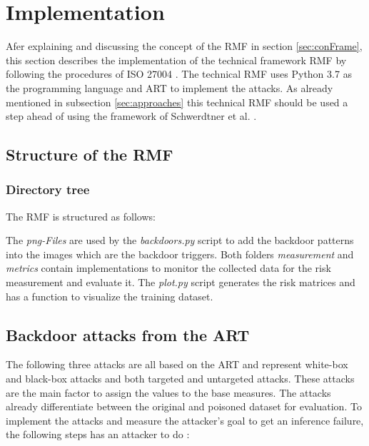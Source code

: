 \section{Implementation}
\label{sec:implementation}

Afer explaining and discussing the concept of the RMF in section \ref{sec:conFrame}, this section describes the implementation of the technical framework RMF by following the procedures of ISO 27004 \cite{ISO_27004_2009}. The technical RMF uses Python 3.7 \cite{10.5555/1593511} as the programming language and ART to implement the attacks. As already mentioned in subsection \ref{sec:approaches} this technical RMF should be used a step ahead of using the framework of Schwerdtner et al. \cite{DBLP:journals/corr/abs-2011-04328}.

\subsection{Structure of the RMF}

\subsubsection*{Directory tree}

The RMF is structured as follows: \\


\hfill \break \noindent The \textit{png-Files} are used by the \textit{backdoors.py} script to add the backdoor patterns into the images which are the backdoor triggers. Both folders \textit{measurement} and \textit{metrics} contain implementations to monitor the collected data for the risk measurement and evaluate it. The \textit{plot.py} script generates the risk matrices and has a function to visualize the training dataset.

\subsection{Backdoor attacks from the ART}
\label{sec:impl_backdoor_attacks}

The following three attacks are all based on the ART \cite{art2018} and represent white-box and black-box attacks and both targeted and untargeted attacks. These attacks are the main factor to assign the values to the base measures. The attacks already differentiate between the original and poisoned dataset for evaluation. To implement the attacks and measure the attacker's goal to get an inference failure, the following steps has an attacker to do \cite{DBLP:journals/corr/abs-2003-03675}: \\

